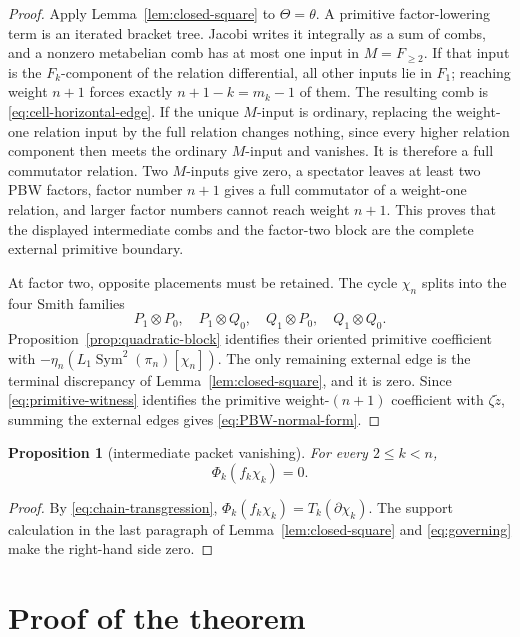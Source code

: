 \documentclass[11pt]{amsart}
\newtheorem{proposition}[theorem]{Proposition}
\theoremstyle{remark}
\newcommand{\Sym}{\operatorname{Sym}}
\begin{document}
\begin{proof}
Apply Lemma~\ref{lem:closed-square} to $\Theta=\theta$.  A primitive
factor-lowering term is an iterated bracket tree.  Jacobi writes it
integrally as a sum of combs, and a nonzero metabelian comb has at most
one input in $M=F_{\geq2}$.  If that input is the $F_k$-component of the
relation differential, all other inputs lie in $F_1$; reaching weight
$n+1$ forces exactly $n+1-k=m_k-1$ of them.  The resulting comb is
\eqref{eq:cell-horizontal-edge}.  If the unique $M$-input is ordinary,
replacing the weight-one relation input by the full relation changes
nothing, since every higher relation component then meets the ordinary
$M$-input and vanishes.  It is therefore a full commutator relation.
Two $M$-inputs give zero, a spectator leaves at least two PBW factors,
factor number $n+1$ gives a full commutator of a weight-one relation,
and larger factor numbers cannot reach weight $n+1$.  This proves that
the displayed intermediate combs and the factor-two block are the
complete external primitive boundary.

At factor two, opposite placements must be retained.  The cycle
$\chi_n$ splits into the four Smith families
\[
 P_1\otimes P_0,\quad P_1\otimes Q_0,\quad
 Q_1\otimes P_0,\quad Q_1\otimes Q_0.
\]
Proposition~\ref{prop:quadratic-block} identifies their oriented
primitive coefficient with
$-\eta_n(L_1\Sym^2(\pi_n)[\chi_n])$.  The only remaining external edge
is the terminal discrepancy of Lemma~\ref{lem:closed-square}, and it is
zero.  Since \eqref{eq:primitive-witness} identifies the primitive
weight-$(n+1)$ coefficient with $\zeta\widetilde z$, summing the external
edges gives \eqref{eq:PBW-normal-form}.
\end{proof}

\begin{proposition}[intermediate packet vanishing]
\label{prop:intermediate-vanishing}
For every $2\leq k<n$,
\[
                         \Phi_k(f_k\chi_k)=0.
\]
\end{proposition}

\begin{proof}
By \eqref{eq:chain-transgression},
$\Phi_k(f_k\chi_k)=T_k(\partial\chi_k)$.  The support calculation in
the last paragraph of Lemma~\ref{lem:closed-square} and
\eqref{eq:governing} make the right-hand side zero.
\end{proof}

\section{Proof of the theorem}
\end{document}
